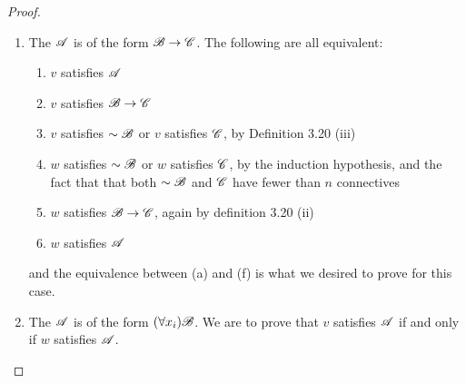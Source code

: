 \begin{proposition}
\begin{proof}
\begin{enumerate}
      \item The \wf{} \(\mathscr{A}\) is of the form \(\mathscr{B} \rightarrow \mathscr{C}\). The following are all equivalent:
        \begin{enumerate}[align=left]
          \item \(v\) satisfies \(\mathscr{A}\)
          \item \(v\) satisfies \(\mathscr{B} \rightarrow \mathscr{C}\)
          \item \(v\) satisfies \(\sim\mathscr{B}\) or \(v\) satisfies \(\mathscr{C}\), by Definition 3.20 (iii)
          \item \(w\) satisfies \(\sim\mathscr{B}\) or \(w\) satisfies \(\mathscr{C}\), by the induction hypothesis, and the fact that that both \(\sim\mathscr{B}\) and \(\mathscr{C}\) have fewer than \(n\) connectives
          \item \(w\) satisfies \(\mathscr{B} \rightarrow \mathscr{C}\), again by definition 3.20 (ii)
          \item \(w\) satisfies \(\mathscr{A}\)
        \end{enumerate}
        and the equivalence between (a) and (f) is what we desired to prove for this case.

      \item The \wf{} \(\mathscr{A}\) is of the form \((\forall x_i) \mathscr{B}\). We are to prove that \(v\) satisfies \(\mathscr{A}\) if and only if \(w\) satisfies \(\mathscr{A}\).


\end{enumerate}
\end{proof}
\end{proposition}

